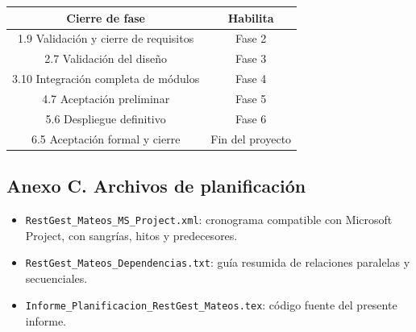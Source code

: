 \documentclass[12pt,a4paper]{article}
\begin{document}
\begin{center}
\renewcommand{\arraystretch}{1.25}
\begin{tabular}{|c|c|}
\hline
\rowcolor{tableheader}
\textbf{Cierre de fase} & \textbf{Habilita} \\ \hline
1.9 Validación y cierre de requisitos & Fase 2 \\ \hline
2.7 Validación del diseño & Fase 3 \\ \hline
3.10 Integración completa de módulos & Fase 4 \\ \hline
4.7 Aceptación preliminar & Fase 5 \\ \hline
5.6 Despliegue definitivo & Fase 6 \\ \hline
6.5 Aceptación formal y cierre & Fin del proyecto \\ \hline
\end{tabular}
\end{center}

\subsection*{Anexo C. Archivos de planificación}

\begin{itemize}
    \item \texttt{RestGest\_Mateos\_MS\_Project.xml}: cronograma compatible con Microsoft Project, con sangrías, hitos y predecesores.
    \item \texttt{RestGest\_Mateos\_Dependencias.txt}: guía resumida de relaciones paralelas y secuenciales.
    \item \texttt{Informe\_Planificacion\_RestGest\_Mateos.tex}: código fuente del presente informe.
\end{itemize}
\end{document}
